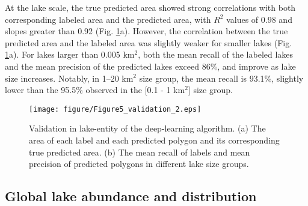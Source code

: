 \documentclass[preprint,12pt,authoryear]{elsarticle}
\begin{document}
At the lake scale, the true predicted area showed strong correlations with both corresponding labeled area and the predicted area, with $R^2$ values of 0.98 and slopes greater than 0.92 (Fig. \ref{fig:Fig5}a). However, the correlation between the true predicted area and the labeled area was slightly weaker for smaller lakes (Fig. \ref{fig:Fig5}a). For lakes larger than 0.005 km$^2$, both the mean recall of the labeled lakes and the mean precision of the predicted lakes exceed 86\%, and improve as lake size increases. Notably, in 1–20 km$^2$ size group, the mean recall is 93.1\%, slightly lower than the 95.5\% observed in the [0.1 - 1 km$^2$] size group.

\begin{figure}[h]
    \centering
    \texttt{[image: figure/Figure5\_validation\_2.eps]}
    \caption{Validation in lake-entity of the deep-learning algorithm. (a) The area of each label and each predicted polygon and its corresponding true predicted area. (b) The mean recall of labels and mean precision of predicted polygons in different lake size groups.}
    \label{fig:Fig5}
\end{figure}

\subsection{Global lake abundance and distribution}
\label{subsec32}
\end{document}
